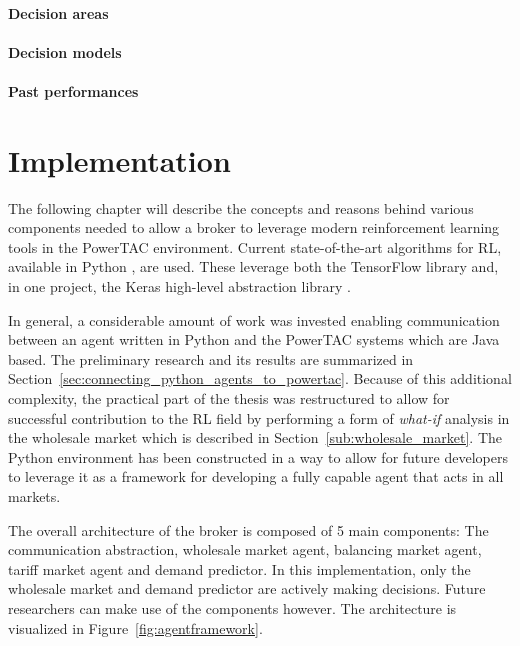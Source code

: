 \subsubsection{Decision areas}%
\label{ssub:decision_areas}



\subsubsection{Decision models}%
\label{ssub:decision_models}

\subsubsection{Past performances}%
\label{ssub:past_performances}


\chapter{Implementation}

The following chapter will describe the concepts and reasons behind various components needed to allow a broker to
leverage modern reinforcement learning tools in the \ac {PowerTAC} environment. Current state-of-the-art
algorithms for \ac {RL}, available in Python \citep{baselines}, are used. These leverage both the TensorFlow library
and, in one project, the Keras high-level abstraction library \citep{plappert2016kerasrl}.

In general, a considerable amount of work was invested enabling communication between an agent
written in Python and the \ac {PowerTAC} systems which are Java based. The preliminary research and its results are summarized in
Section~\ref{sec:connecting_python_agents_to_powertac}. Because of this additional complexity, the practical part of the thesis was
restructured to allow for successful contribution to the \ac {RL} field by performing a form of \emph{what-if}
analysis in the wholesale market which is described in Section~\ref{sub:wholesale_market}. The Python environment has
been constructed in a way to allow for future developers to leverage it as a framework for developing a fully capable
agent that acts in all markets.

The overall architecture of the broker is composed of 5 main components: The communication abstraction, wholesale market
agent, balancing market agent, tariff market agent and demand predictor. In this implementation, only the wholesale
market and demand predictor are actively making decisions. Future researchers can make use of the components however. 
The architecture is visualized in Figure~\ref{fig:agentframework}.

